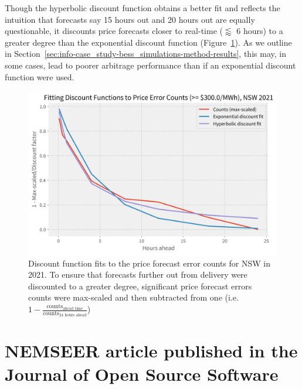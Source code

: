 \documentclass[12pt,a4paper,]{report}
\begin{document}
Though the hyperbolic discount function obtains a better fit and
reflects the intuition that forecasts say 15 hours out and 20 hours out
are equally questionable, it discounts price forecasts closer to
real-time (\(\lessapprox\) 6 hours) to a greater degree than the
exponential discount function
(Figure~\ref{fig:discount_function_fitting}). As we outline in
Section~\ref{sec:info-case_study-bess_simulations-method-results}, this
may, in some cases, lead to poorer arbitrage performance than if an
exponential discount function were used.

\begin{figure}
\hypertarget{fig:discount_function_fitting}{%
\centering
\includegraphics{source/figures/curve_fits_300.0.png}
\caption[Price forecast error counts for NSW in 2021, and the fitted
exponential and hyperbolic discount functions]{Discount function fits to
the price forecast error counts for NSW in 2021. To ensure that
forecasts further out from delivery were discounted to a greater degree,
significant price forecast errors counts were max-scaled and then
subtracted from one
(i.e.~\(1-\frac{\textrm{counts}_{\textrm{ahead time}}}{\textrm{counts}_{\textrm{24 hours ahead}}}\))}\label{fig:discount_function_fitting}
}
\end{figure}

\hypertarget{sec:appendix-joss}{%
\chapter{NEMSEER article published in the Journal of Open Source
Software}\label{sec:appendix-joss}}


\setlength{\footskip}{60pt}
\end{document}

